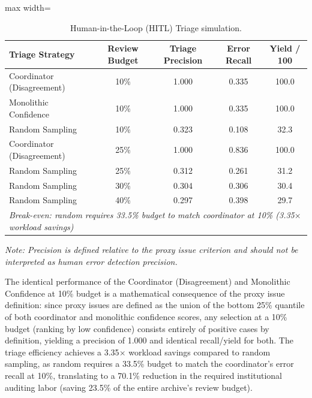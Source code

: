 \documentclass[11pt,a4paper]{article}
\begin{document}
\begin{table}[htbp]
\centering
\caption{Human-in-the-Loop (HITL) Triage simulation.}
\label{tab:hitl_sim}
\begin{adjustbox}{max width=\linewidth}
\begin{tabular}{lcccc}
\toprule
\textbf{Triage Strategy} & \textbf{Review Budget} & \textbf{Triage Precision} & \textbf{Error Recall} & \textbf{Yield / 100} \\
\midrule
Coordinator (Disagreement) & 10\% & 1.000 & 0.335 & 100.0 \\
Monolithic Confidence      & 10\% & 1.000 & 0.335 & 100.0 \\
Random Sampling            & 10\% & 0.323 & 0.108 & 32.3 \\
\midrule
Coordinator (Disagreement) & 25\% & 1.000 & 0.836 & 100.0 \\
Random Sampling            & 25\% & 0.312 & 0.261 & 31.2 \\
\midrule
Random Sampling            & 30\% & 0.304 & 0.306 & 30.4 \\
Random Sampling            & 40\% & 0.297 & 0.398 & 29.7 \\
\midrule
\multicolumn{5}{l}{\textit{Break-even: random requires 33.5\% budget to match coordinator at 10\% (3.35$\times$ workload savings)}} \\
\bottomrule
\end{tabular}
\end{adjustbox}
\begin{flushleft}
\small{\textit{Note: Precision is defined relative to the proxy issue criterion and should not be interpreted as human error detection precision.}}
\end{flushleft}
\end{table}

The identical performance of the Coordinator (Disagreement) and Monolithic Confidence at 10\% budget is a mathematical consequence of the proxy issue definition: since proxy issues are defined as the union of the bottom 25\% quantile of both coordinator and monolithic confidence scores, any selection at a 10\% budget (ranking by low confidence) consists entirely of positive cases by definition, yielding a precision of 1.000 and identical recall/yield for both.
The triage efficiency achieves a 3.35$\times$ workload savings compared to random sampling, as random requires a 33.5\% budget to match the coordinator's error recall at 10\%, translating to a 70.1\% reduction in the required institutional auditing labor (saving 23.5\% of the entire archive's review budget).
\end{document}
